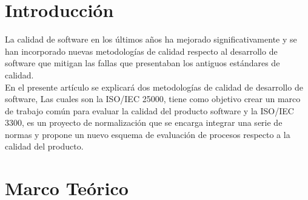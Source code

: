 \documentclass[preprint,12pt]{elsarticle}
\begin{document}
\section{Introducción}
La calidad de software en los últimos años ha mejorado significativamente y se han incorporado nuevas metodologías de calidad respecto al desarrollo de software que mitigan las fallas que presentaban los antiguos estándares de calidad.
\\
En el presente artículo se explicará dos metodologías de calidad de desarrollo de software, Las cuales son la ISO/IEC 25000, tiene como objetivo crear un marco de trabajo común para evaluar la calidad del producto software y la ISO/IEC 3300,  es un proyecto de normalización que se encarga integrar una serie de normas y propone un nuevo esquema de evaluación de procesos respecto a la calidad del producto.
\\

\section{Marco Teórico}
\end{document}
